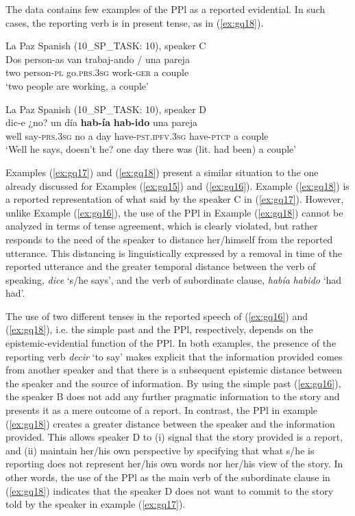 \documentclass[output=paper]{langsci/langscibook}
\begin{document}
The data contains few examples of the PPl as a reported evidential. In such cases, the reporting verb is in present tense, as in (\ref{ex:gq18}). 

\ea La Paz Spanish (10\_SP\_TASK: 10), speaker C\label{ex:gq17}\\
	\gll Dos person-as van trabaj-ando / una pareja\\
	two person-\textsc{pl} go.\textsc{prs.3sg} work-\textsc{ger} {} a couple {}\\
	\glt ‘two people are working, a couple’
\z

\newpage
\ea La Paz Spanish (10\_SP\_TASK: 10), speaker D \label{ex:gq18}\\
	 dic-e ¿no? un día \textbf{hab-ía} \textbf{hab-ido} una pareja\\
	well say-\textsc{prs.3sg} no a day have-\textsc{pst.ipfv.3sg} have-\textsc{ptcp} a couple {}\\
	\glt ‘Well he says, doesn’t he? one day there was (lit. had been) a couple’ 
\z

Examples (\ref{ex:gq17}) and (\ref{ex:gq18}) present a similar situation to the one already discussed for Examples (\ref{ex:gq15}) and (\ref{ex:gq16}). Example (\ref{ex:gq18}) is a reported representation of what said by the speaker C in (\ref{ex:gq17}). However, unlike Example (\ref{ex:gq16}), the use of the PPl in Example (\ref{ex:gq18}) cannot be analyzed in terms of tense agreement, which is clearly violated, but rather responds to the need of the speaker to distance her/himself from the reported utterance. This distancing is linguistically expressed by a removal in time of the reported utterance and the greater temporal distance between the verb of speaking, \textit{dice} ‘s/he says’, and the verb of subordinate clause, \textit{había} \textit{habido} ‘had had’.

The use of two different tenses in the reported speech of (\ref{ex:gq16}) and (\ref{ex:gq18}), i.e. the simple past and the PPl, respectively, depends on the epistemic-evidential function of the PPl. In both examples, the presence of the reporting verb \textit{decir} ‘to say’ makes explicit that the information provided comes from another speaker and that there is a subsequent epistemic distance between the speaker and the source of information. By using the simple past (\ref{ex:gq16}), the speaker B does not add any further pragmatic information to the story and presents it as a mere outcome of a report. In contrast, the PPl in example (\ref{ex:gq18}) creates a greater distance between the speaker and the information provided. This allows speaker D to (i) signal that the story provided is a report, and (ii) maintain her/his own perspective by specifying that what s/he is reporting does not represent her/his own words nor her/his view of the story. In other words, the use of the PPl as the main verb of the subordinate clause in (\ref{ex:gq18}) indicates that the speaker D does not want to commit to the story told by the speaker in example (\ref{ex:gq17}). 
\end{document}
